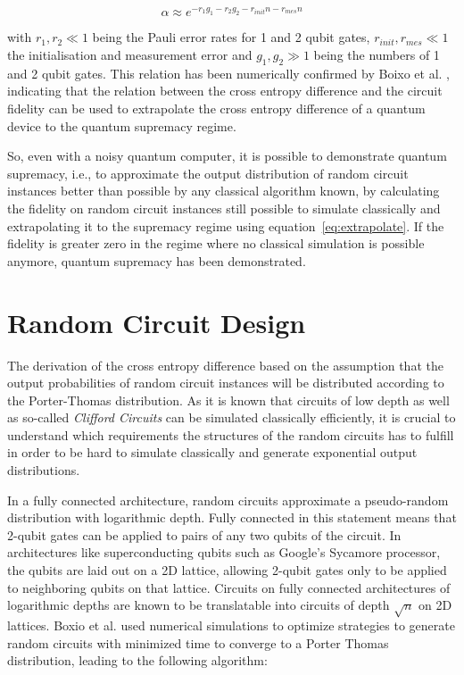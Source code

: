 \begin{equation}
  \alpha \approx e^{-r_1g_1 - r_2g_2 -r_{init}n -r_{mes}n}
\end{equation}

with $r_1, r_2 \ll 1$ being the Pauli error rates for 1 and 2 qubit gates, $r_{init},
r_{mes} \ll 1$ the initialisation and measurement error and $g_1,g_2 \gg 1$ being the
numbers of 1 and 2 qubit gates. This relation has been numerically confirmed by
Boixo et al. \cite{Boixo2018supremacy}, indicating that the relation between the
cross entropy difference and the circuit fidelity can be used to extrapolate the
cross entropy difference of a quantum device to the quantum supremacy regime.

So, even with a noisy quantum computer, it is possible to demonstrate quantum
supremacy, i.e., to approximate the output distribution of random circuit instances
better than possible by any classical algorithm known, by
calculating the fidelity on random circuit instances still possible to simulate
classically and extrapolating it to the supremacy regime using
equation~\ref{eq:extrapolate}.
If the fidelity is greater zero in the regime where no classical simulation is possible anymore,
quantum supremacy has been demonstrated.

\section{Random Circuit Design}

The derivation of the cross entropy difference based on the assumption that the
output probabilities of random circuit instances will be distributed according to
the Porter-Thomas distribution. As it is known that circuits of low depth as
well as so-called \textit{Clifford Circuits} can be simulated classically
efficiently, it is crucial to understand which requirements the structures of
the random circuits has to fulfill in order to be hard to simulate classically and generate
exponential output distributions.

In a fully connected architecture, random circuits approximate a pseudo-random
distribution with logarithmic depth. Fully connected in this statement means
that 2-qubit gates can be applied to pairs of any two qubits of the circuit. In
architectures like superconducting qubits such as Google's Sycamore
processor, the qubits are laid out on a 2D lattice, allowing 2-qubit gates only
to be applied to neighboring qubits on that lattice. Circuits on fully
connected architectures of logarithmic depths are known to be translatable into
circuits of depth $\sqrt{n}$ on 2D lattices. Boxio et al. used numerical
simulations to optimize strategies to generate random circuits with minimized
time to converge to a Porter Thomas distribution, leading to the following algorithm:

